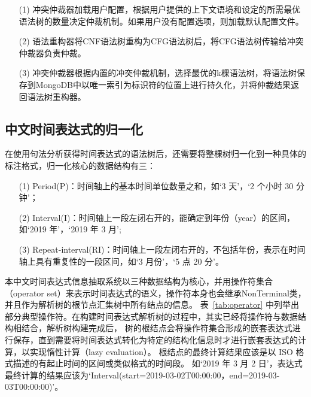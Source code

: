 \begin{enumerate}
    \item[(1)] 冲突仲裁器加载用户配置，根据用户提供的上下文语境和设定的所需最优语法树的数量决定仲裁机制。如果用户没有配置选项，则加载默认配置文件。
    \item[(2)] 语法重构器将CNF语法树重构为CFG语法树后，将CFG语法树传输给冲突仲裁器负责仲裁。
    \item[(3)] 冲突仲裁器根据内置的冲突仲裁机制，选择最优的k棵语法树，将语法树保存到MongoDB中以唯一索引为标识符的位置上进行持久化，并将仲裁结果返回语法树重构器。
\end{enumerate}

\subsection{中文时间表达式的归一化}

在使用句法分析获得时间表达式的语法树后，还需要将整棵树归一化到一种具体的标注格式，归一化核心的数据结构有三：
\begin{enumerate}
    \item[(1)] Period(P)：时间轴上的基本时间单位数量之和，如‘3 天’，‘2 个小时 30 分钟’；
    \item[(2)] Interval(I)：时间轴上一段左闭右开的，能确定到年份（year）的区间，如‘2019 年’，‘2019 年 3 月’;
    \item[(3)] Repeat-interval(RI)：时间轴上一段左闭右开的，不包括年份，表示在时间轴上具有重复性的一段区间，如‘3 月份’，‘5 点 20 分’。
\end{enumerate}

本中文时间表达式信息抽取系统以三种数据结构为核心，并用操作符集合（operator set）来表示时间表达式的语义，操作符本身也会继承NonTerminal类，并且作为解析树的根节点汇集树中所有结点的信息。
表~\ref{tab:operator} 中列举出部分典型操作符。在构建时间表达式解析树的过程中，其实已经将操作符与数据结构相结合，解析树构建完成后，
树的根结点会将操作符集合形成的嵌套表达式进行保存，直到需要将时间表达式转化为特定的结构化信息时才进行嵌套表达式的计算，以实现惰性计算（lazy evaluation）。
根结点的最终计算结果应该是以 ISO 格式描述的有起止时间的区间或类似格式的时间段。
如‘2019 年 3 月 2 日’，表达式最终计算的结果应该为‘Interval(start=2019-03-02T00:00:00，end=2019-03-03T00:00:00)’。

